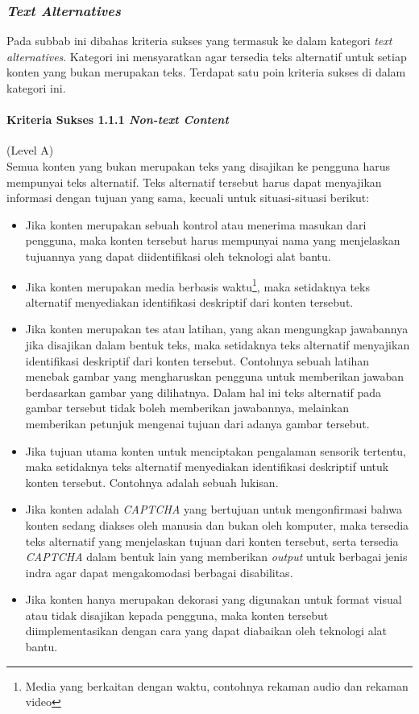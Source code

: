 \subsubsection{\textit{Text Alternatives}}
\label{sec:text_alternatives}
Pada subbab ini dibahas kriteria sukses yang termasuk ke dalam kategori \textit{text alternatives}. Kategori ini mensyaratkan agar tersedia teks alternatif untuk setiap konten yang bukan merupakan teks. Terdapat satu poin kriteria sukses di dalam kategori ini.

\paragraph{Kriteria Sukses 1.1.1 \textit{Non-text Content}}
\label{sec:kriteria_sukses_1.1.1}
(Level A)\\

Semua konten yang bukan merupakan teks yang disajikan ke pengguna harus mempunyai teks alternatif. Teks alternatif tersebut harus dapat menyajikan informasi dengan tujuan yang sama, kecuali untuk situasi-situasi berikut:
\begin{itemize}
	\item Jika konten merupakan sebuah kontrol atau menerima masukan dari pengguna, maka konten tersebut harus mempunyai nama yang menjelaskan tujuannya yang dapat diidentifikasi oleh teknologi alat bantu.
	\item Jika konten merupakan media berbasis waktu\footnote{Media yang berkaitan dengan waktu, contohnya rekaman audio dan rekaman video}, maka setidaknya teks alternatif menyediakan identifikasi deskriptif dari konten tersebut.
	\item Jika konten merupakan tes atau latihan, yang akan mengungkap jawabannya jika disajikan dalam bentuk teks, maka setidaknya teks alternatif menyajikan identifikasi deskriptif dari konten tersebut. Contohnya sebuah latihan menebak gambar yang mengharuskan pengguna untuk memberikan jawaban berdasarkan gambar yang dilihatnya. Dalam hal ini teks alternatif pada gambar tersebut tidak boleh memberikan jawabannya, melainkan memberikan petunjuk mengenai tujuan dari adanya gambar tersebut.
	\item Jika tujuan utama konten untuk menciptakan pengalaman sensorik tertentu, maka setidaknya teks alternatif menyediakan identifikasi deskriptif untuk konten tersebut. Contohnya adalah sebuah lukisan.
	\item Jika konten adalah \textit{CAPTCHA} yang bertujuan untuk mengonfirmasi bahwa konten sedang diakses oleh manusia dan bukan oleh komputer, maka tersedia teks alternatif yang menjelaskan tujuan dari konten tersebut, serta tersedia \textit{CAPTCHA} dalam bentuk lain yang memberikan \textit{output} untuk berbagai jenis indra agar dapat mengakomodasi berbagai disabilitas.
	\item Jika konten hanya merupakan dekorasi yang digunakan untuk format visual atau tidak disajikan kepada pengguna, maka konten tersebut diimplementasikan dengan cara yang dapat diabaikan oleh teknologi alat bantu.
\end{itemize}

